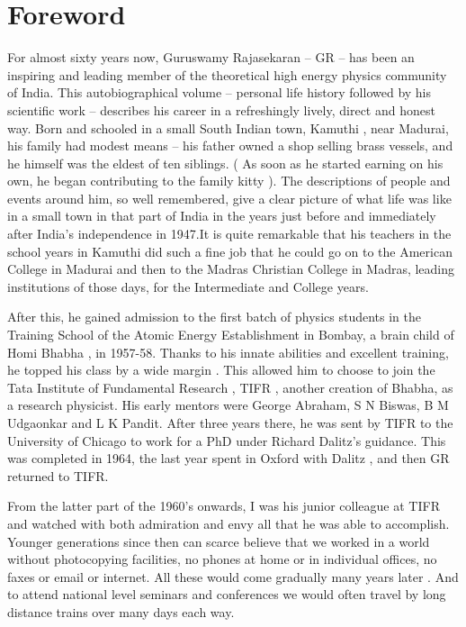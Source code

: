 \chapter*{Foreword}


For almost sixty years now, Guruswamy Rajasekaran – GR – has been an 
inspiring and leading member of the theoretical high energy physics 
community of India. This autobiographical volume – personal life 
history followed by his scientific work – describes his career in a 
refreshingly lively, direct and honest way. Born and schooled in a 
small South Indian town, Kamuthi , near Madurai, his family had modest 
means – his father owned a shop selling brass vessels, and he himself 
was the eldest of ten siblings. ( As soon as he started earning on his 
own, he began contributing to the family kitty ). The descriptions of 
people and events around him, so well remembered, give a clear picture 
of what life was like in a small town in that part of India in the 
years just before and immediately after India’s independence in 1947.It 
is quite remarkable that his teachers in the school years in Kamuthi 
did such a fine job that he could go on to the American College in 
Madurai and then to the Madras Christian College in Madras, leading 
institutions of those days, for the Intermediate and College years.

After this, he gained admission to the first batch of physics students 
in the Training School of the Atomic Energy Establishment in Bombay, a 
brain child of Homi Bhabha , in 1957-58. Thanks to his innate abilities 
and excellent training, he topped his class by a wide margin . This 
allowed him to choose to join the Tata Institute of Fundamental 
Research , TIFR , another creation of Bhabha, as a research physicist. 
His early mentors were George Abraham, S N Biswas, B M Udgaonkar and L 
K Pandit. After three years there, he was sent by TIFR to the 
University of Chicago to work for a PhD under Richard Dalitz’s 
guidance. This was completed in 1964, the last year spent in Oxford 
with Dalitz , and then GR returned to TIFR.

From the latter part of the 1960’s onwards, I was his junior colleague 
at TIFR and watched with both admiration and envy all that he was able 
to accomplish. Younger generations since then can scarce believe that 
we worked in a world without photocopying facilities, no phones at home 
or in individual offices, no faxes or email or internet. All these 
would come gradually many years later . And to attend national level 
seminars and conferences we would often travel by long distance trains 
over many days each way.

